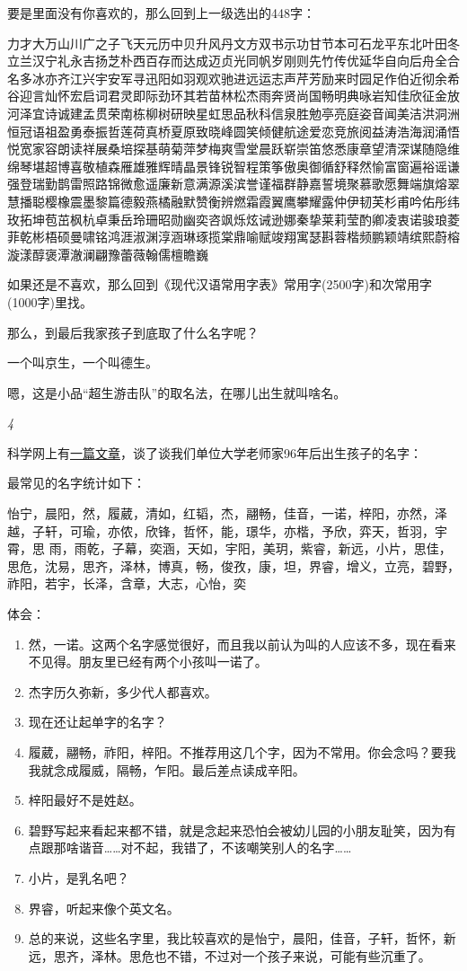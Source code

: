 \documentclass[twoside,openright,headings=optiontohead]{ctexbook} %
\providecommand{\tightlist}{%
   \setlength{\itemsep}{0pt}\setlength{\parskip}{0pt}}
\begin{document}
{要是里面没有你喜欢的，那么回到上一级选出的448字：

力才大万山川广之子飞天元历中贝升风丹文方双书示功甘节本可石龙平东北叶田冬立兰汉宁礼永吉扬芝朴西百存而达成迈贞光同帆岁刚则先竹传优延华自向后舟全合名多冰亦齐江兴宇安军寻迅阳如羽观欢驰进远运志声芹芳励来时园足作伯近彻余希谷迎言灿怀宏启词君灵即际劲环其若苗林松杰雨奔贤尚国畅明典咏岩知佳欣征金放河泽宜诗诚建孟贯荣南栋柳树研映星虹思品秋科信泉胜勉亭亮庭姿音闻美洁洪洞洲恒冠语祖盈勇泰振哲莲荷真桥夏原致晓峰圆笑倾健航途爱恋竞旅阅益涛浩海润涌悟悦宽家容朗读祥展桑培探基萌菊萍梦梅爽雪堂晨跃崭崇笛悠悉康章望清深谋随隐维绵琴堪超博喜敬植森雁雄雅辉晴晶景锋锐智程策筝傲奥御循舒释然愉富窗遍裕谣谦强登瑞勤鹊雷照路锦微愈遥廉新意满源溪滨誉谨福群静嘉誓境聚慕歌愿舞端旗熔翠慧播聪樱橡震墨黎篇德毅燕橘融默赞衡辨燃霜霞翼鹰攀耀露仲伊韧芙杉甫吟佑彤纬玫拓坤苞茁枫杭卓秉岳玲珊昭勋幽奕咨飒烁炫诫逊娜秦挚莱莉莹酌卿凌衷诺骏琅菱菲乾彬梧硕曼啸铭鸿涯淑渊淳涵琳琢揽棠鼎喻赋竣翔寓瑟斟蓉楷频鹏颖靖缤熙蔚榕漩漾醇褒潭澈澜翩豫蕾薇翰儒檀瞻巍

如果还是不喜欢，那么回到《现代汉语常用字表》常用字(2500字)和次常用字(1000字)里找。

那么，到最后我家孩子到底取了什么名字呢？

一个叫京生，一个叫德生。

嗯，这是小品``超生游击队''的取名法，在哪儿出生就叫啥名。

\emph{4}

科学网上有\href{http://www.sciencetimes.com.cn/m/user_content.aspx?id=329159}{一篇文章}，谈了谈我们单位大学老师家96年后出生孩子的名字：

最常见的名字统计如下：

怡宁，晨阳，然，履葳，清如，红韬，杰，翮畅，佳音，一诺，梓阳，亦然，泽越，子轩，可瑜，亦侬，欣锋，哲怀，能，璟华，亦楷，予欣，弈天，哲羽，宇霄，思
雨，雨乾，子幕，奕涵，天如，宇阳，美玥，紫睿，新远，小片，思佳，思危，沈易，思齐，泽林，博真，畅，俊孜，康，坦，界睿，增义，立亮，碧野，祚阳，若宇，长泽，含章，大志，心怡，奕

体会：

\begin{enumerate}
\def\labelenumi{\arabic{enumi}.}
\tightlist
\item
  然，一诺。这两个名字感觉很好，而且我以前认为叫的人应该不多，现在看来不见得。朋友里已经有两个小孩叫一诺了。
\item
  杰字历久弥新，多少代人都喜欢。
\item
  现在还让起单字的名字？
\item
  履葳，翮畅，祚阳，梓阳。不推荐用这几个字，因为不常用。你会念吗？要我我就念成履威，隔畅，乍阳。最后差点读成辛阳。
\item
  梓阳最好不是姓赵。
\item
  碧野写起来看起来都不错，就是念起来恐怕会被幼儿园的小朋友耻笑，因为有点跟那啥谐音\ldots{}\ldots{}对不起，我错了，不该嘲笑别人的名字\ldots{}\ldots{}
\item
  小片，是乳名吧？
\item
  界睿，听起来像个英文名。
\item
  总的来说，这些名字里，我比较喜欢的是怡宁，晨阳，佳音，子轩，哲怀，新远，思齐，泽林。思危也不错，不过对一个孩子来说，可能有些沉重了。
\end{enumerate}

}
\end{document}
